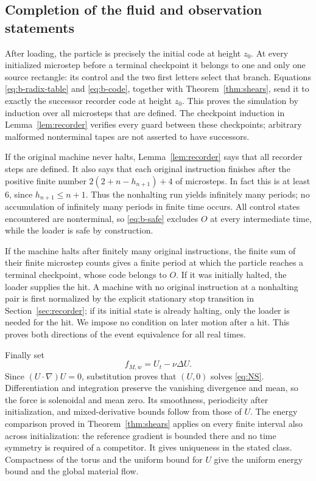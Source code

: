 \documentclass[11pt]{article}
\theoremstyle{remark}
\begin{document}
\subsection{Completion of the fluid and observation statements}
After loading, the particle is precisely the initial code at height $z_0$.
At every initialized microstep before a terminal checkpoint it belongs to
one and only one source rectangle: its control and the two first letters select that
branch. Equations \eqref{eq:b-radix-table} and \eqref{eq:b-code}, together
with Theorem~\ref{thm:shears}, send it to exactly the successor recorder
code at height $z_0$. This proves the simulation by induction over all
microsteps that are defined. The checkpoint induction in
Lemma~\ref{lem:recorder} verifies every guard between these checkpoints;
arbitrary malformed nonterminal tapes are not asserted to have successors.

If the original machine never halts, Lemma~\ref{lem:recorder} says that
all recorder steps are defined. It also says that each original instruction
finishes after the positive finite number
$2(2+n-h_{n+1})+4$ of microsteps. In fact this is at least $6$, since
$h_{n+1}\le n+1$. Thus the nonhalting run yields infinitely many periods;
no accumulation of infinitely many periods in finite time occurs. All
control states encountered are nonterminal, so \eqref{eq:b-safe} excludes
$O$ at every intermediate time, while the loader is safe by construction.

If the machine halts after finitely many original instructions, the finite
sum of their finite microstep counts gives a finite period at which the
particle reaches a terminal checkpoint, whose code belongs to $O$.
If it was initially halted, the loader supplies the hit. A machine with
no original instruction at a nonhalting pair is first normalized by the
explicit stationary stop transition in Section~\ref{sec:recorder}; if its
initial state is already halting, only the loader is needed for the hit. We impose no
condition on later motion after a hit. This proves both directions of
the event equivalence for all real times.

Finally set
\begin{equation}\label{eq:b-force}
 f_{M,w}=U_t-\nu\Delta U.
\end{equation}
Since $(U\cdot\nabla)U=0$, substitution proves that $(U,0)$ solves
\eqref{eq:NS}. Differentiation and integration preserve the vanishing
divergence and mean, so the force is solenoidal and mean zero. Its
smoothness, periodicity after initialization, and mixed-derivative bounds
follow from those of $U$. The energy comparison proved in
Theorem~\ref{thm:shears} applies on every finite interval also across
initialization: the reference gradient is bounded there and no time
symmetry is required of a competitor. It gives uniqueness in the stated
class. Compactness of the torus and the uniform bound for $U$ give the
uniform energy bound and the global material flow.
\end{document}
